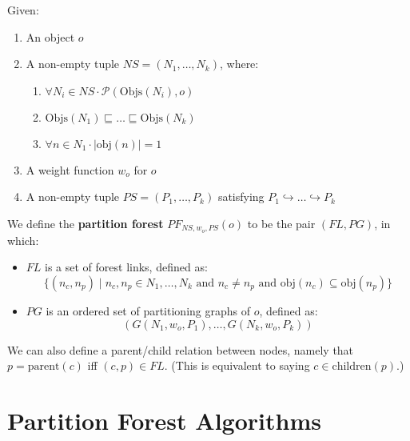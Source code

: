 \begin{definition}
Given:

\begin{enumerate}

\item An object $o$
\item A non-empty tuple $\textit{NS} = (N_1,\ldots,N_k)$, where:

\begin{enumerate}

\item $\forall N_i \in \textit{NS} \cdot \mathcal{P}(\mbox{Objs}(N_i),o)$
\item $\mbox{Objs}(N_1) \sqsubseteq \ldots \sqsubseteq \mbox{Objs}(N_k)$ 
\item $\forall n \in N_1 \cdot |\mbox{obj}(n)| = 1$

\end{enumerate}

\item A weight function $w_o$ for $o$
\item A non-empty tuple $\textit{PS} = (P_1,\ldots,P_k)$ satisfying $P_1 \hookrightarrow \ldots \hookrightarrow P_k$

\end{enumerate}

\noindent We define the \textbf{partition forest} $PF_{\textit{NS},w_o,\textit{PS}}(o)$ to be the pair $(\textit{FL},\textit{PG})$, in which:

\begin{itemize}

\item $\textit{FL}$ is a set of forest links, defined as:
%
\[
\{(n_c,n_p) \; | \; n_c, n_p \in N_1,\ldots,N_k \mbox{ and } n_c \ne n_p \mbox{ and } \mbox{obj}(n_c) \subseteq \mbox{obj}(n_p)\}
\]

\item $\textit{PG}$ is an ordered set of partitioning graphs of $o$, defined as:
%
\[
(G(N_1,w_o,P_1),\ldots,G(N_k,w_o,P_k))
\]

\end{itemize}

\end{definition}

\noindent We can also define a parent/child relation between nodes, namely that $p = \mbox{parent}(c)$ iff $(c,p) \in \textit{FL}$. (This is equivalent to saying $c \in \mbox{children}(p)$.)

\section{Partition Forest Algorithms}
\label{sec:ipfs-algorithms}

